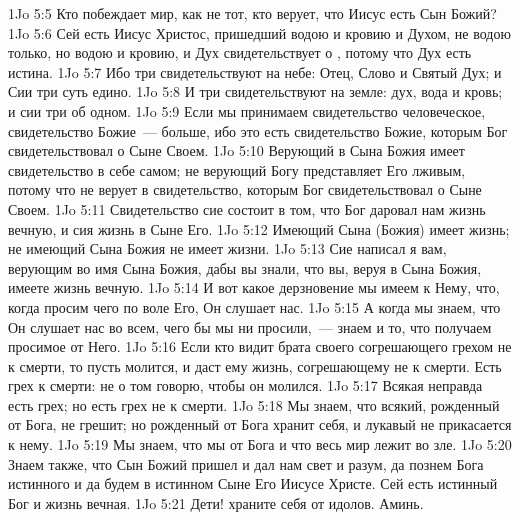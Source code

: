 \vs 1Jo 5:5 Кто побеждает мир, как не тот, кто верует, что Иисус есть Сын Божий?
\vs 1Jo 5:6 Сей есть Иисус Христос, пришедший водою и кровию и Духом, не водою только, но водою и кровию, и Дух свидетельствует о , потому что Дух есть истина.
\vs 1Jo 5:7 Ибо три свидетельствуют на небе: Отец, Слово и Святый Дух; и Сии три суть едино.
\vs 1Jo 5:8 И три свидетельствуют на земле: дух, вода и кровь; и сии три об одном.
\vs 1Jo 5:9 Если мы принимаем свидетельство человеческое, свидетельство Божие~--- больше, ибо это есть свидетельство Божие, которым Бог свидетельствовал о Сыне Своем.
\vs 1Jo 5:10 Верующий в Сына Божия имеет свидетельство в себе самом; не верующий Богу представляет Его лживым, потому что не верует в свидетельство, которым Бог свидетельствовал о Сыне Своем.
\vs 1Jo 5:11 Свидетельство сие состоит в том, что Бог даровал нам жизнь вечную, и сия жизнь в Сыне Его.
\vs 1Jo 5:12 Имеющий Сына (Божия) имеет жизнь; не имеющий Сына Божия не имеет жизни.
\rsbpar\vs 1Jo 5:13 Сие написал я вам, верующим во имя Сына Божия, дабы вы знали, что вы, веруя в Сына Божия, имеете жизнь вечную.
\vs 1Jo 5:14 И вот какое дерзновение мы имеем к Нему, что, когда просим чего по воле Его, Он слушает нас.
\vs 1Jo 5:15 А когда мы знаем, что Он слушает нас во всем, чего бы мы ни просили,~--- знаем и то, что получаем просимое от Него.
\vs 1Jo 5:16 Если кто видит брата своего согрешающего грехом не к смерти, то пусть молится, и  даст ему жизнь,  согрешающему  не к смерти. Есть грех к смерти: не о том говорю, чтобы он молился.
\vs 1Jo 5:17 Всякая неправда есть грех; но есть грех не к смерти.
\rsbpar\vs 1Jo 5:18 Мы знаем, что всякий, рожденный от Бога, не грешит; но рожденный от Бога хранит себя, и лукавый не прикасается к нему.
\vs 1Jo 5:19 Мы знаем, что мы от Бога и что весь мир лежит во зле.
\vs 1Jo 5:20 Знаем также, что Сын Божий пришел и дал нам свет и разум, да познем Бога истинного и да будем в истинном Сыне Его Иисусе Христе. Сей есть истинный Бог и жизнь вечная.
\rsbpar\vs 1Jo 5:21 Дети! храните себя от идолов. Аминь.
